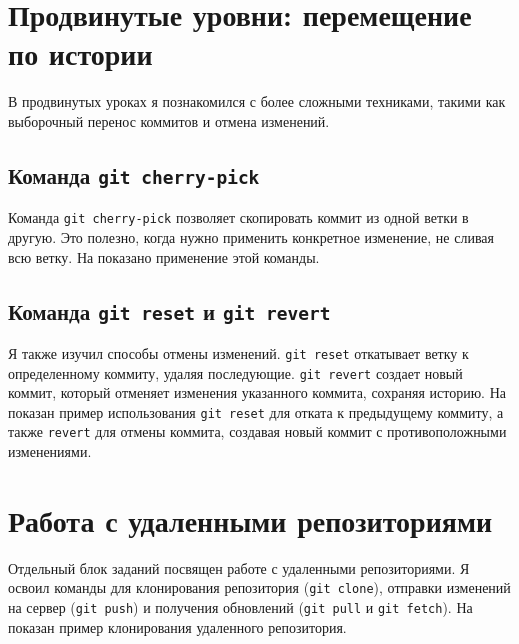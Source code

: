 \label{fig:lgb_rebase}


\section{Продвинутые уровни: перемещение по истории}\label{sec:-:---2}
В продвинутых уроках я познакомился с более сложными техниками, такими как выборочный перенос коммитов и отмена изменений.

\subsection{Команда \texttt{git cherry-pick}}\label{subsec:-texttt{git-cherry-pick}}
Команда \texttt{git cherry-pick} позволяет скопировать коммит из одной ветки в другую.
Это полезно, когда нужно применить конкретное изменение, не сливая всю ветку.
На  показано применение этой команды.

\label{fig:lgb_cherry_pick}

\subsection{Команда \texttt{git reset} и \texttt{git revert}}\label{subsec:-texttt{git-reset}--texttt{git-revert}}
Я также изучил способы отмены изменений. \texttt{git reset} откатывает ветку к определенному коммиту, удаляя последующие. \texttt{git revert} создает новый коммит, который отменяет изменения указанного коммита, сохраняя историю.
На  показан пример использования \texttt{git reset} для отката к предыдущему коммиту, а также \texttt{revert} для отмены коммита, создавая новый коммит с противоположными изменениями.

\label{fig:lgb_reset_revert}


\section{Работа с удаленными репозиториями}\label{sec:---}
Отдельный блок заданий посвящен работе с удаленными репозиториями.
Я освоил команды для клонирования репозитория (\texttt{git clone}), отправки изменений на сервер (\texttt{git push}) и получения обновлений (\texttt{git pull} и \texttt{git fetch}).
На  показан пример клонирования удаленного репозитория.

